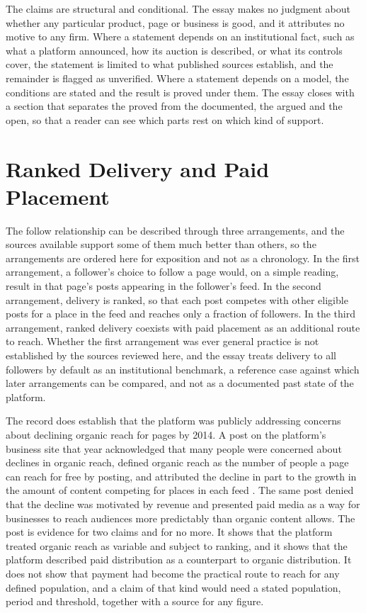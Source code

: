 \documentclass[11pt]{article}
\theoremstyle{definition}
\begin{document}
The claims are structural and conditional. The essay makes no judgment about whether any particular product, page or business is good, and it attributes no motive to any firm. Where a statement depends on an institutional fact, such as what a platform announced, how its auction is described, or what its controls cover, the statement is limited to what published sources establish, and the remainder is flagged as unverified. Where a statement depends on a model, the conditions are stated and the result is proved under them. The essay closes with a section that separates the proved from the documented, the argued and the open, so that a reader can see which parts rest on which kind of support.

\section{Ranked Delivery and Paid Placement}

The follow relationship can be described through three arrangements, and the sources available support some of them much better than others, so the arrangements are ordered here for exposition and not as a chronology. In the first arrangement, a follower's choice to follow a page would, on a simple reading, result in that page's posts appearing in the follower's feed. In the second arrangement, delivery is ranked, so that each post competes with other eligible posts for a place in the feed and reaches only a fraction of followers. In the third arrangement, ranked delivery coexists with paid placement as an additional route to reach. Whether the first arrangement was ever general practice is not established by the sources reviewed here, and the essay treats delivery to all followers by default as an institutional benchmark, a reference case against which later arrangements can be compared, and not as a documented past state of the platform.

The record does establish that the platform was publicly addressing concerns about declining organic reach for pages by 2014. A post on the platform's business site that year acknowledged that many people were concerned about declines in organic reach, defined organic reach as the number of people a page can reach for free by posting, and attributed the decline in part to the growth in the amount of content competing for places in each feed \cite{boland2014}. The same post denied that the decline was motivated by revenue and presented paid media as a way for businesses to reach audiences more predictably than organic content allows. The post is evidence for two claims and for no more. It shows that the platform treated organic reach as variable and subject to ranking, and it shows that the platform described paid distribution as a counterpart to organic distribution. It does not show that payment had become the practical route to reach for any defined population, and a claim of that kind would need a stated population, period and threshold, together with a source for any figure.
\end{document}
